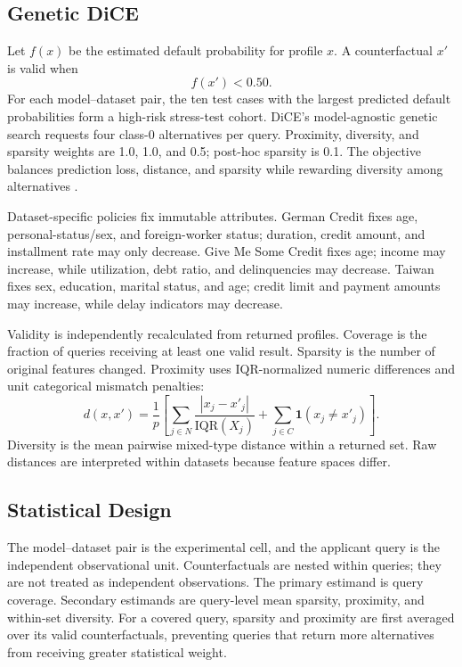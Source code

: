 \documentclass[conference]{IEEEtran}
\begin{document}
\subsection{Genetic DiCE}
Let $f(x)$ be the estimated default probability for profile $x$. A counterfactual $x'$ is valid when
\begin{equation} f(x') < 0.50. \end{equation}
For each model--dataset pair, the ten test cases with the largest predicted default probabilities form a high-risk stress-test cohort. DiCE's model-agnostic genetic search requests four class-0 alternatives per query. Proximity, diversity, and sparsity weights are 1.0, 1.0, and 0.5; post-hoc sparsity is 0.1. The objective balances prediction loss, distance, and sparsity while rewarding diversity among alternatives \cite{mothilal2020dice}.

Dataset-specific policies fix immutable attributes. German Credit fixes age, personal-status/sex, and foreign-worker status; duration, credit amount, and installment rate may only decrease. Give Me Some Credit fixes age; income may increase, while utilization, debt ratio, and delinquencies may decrease. Taiwan fixes sex, education, marital status, and age; credit limit and payment amounts may increase, while delay indicators may decrease.

Validity is independently recalculated from returned profiles. Coverage is the fraction of queries receiving at least one valid result. Sparsity is the number of original features changed. Proximity uses IQR-normalized numeric differences and unit categorical mismatch penalties:
\begin{equation}
d(x,x')=\frac{1}{p}\left[\sum_{j\in N}\frac{|x_j-x'_j|}{\mathrm{IQR}(X_j)}+\sum_{j\in C}\mathbf{1}(x_j\neq x'_j)\right].
\end{equation}
Diversity is the mean pairwise mixed-type distance within a returned set. Raw distances are interpreted within datasets because feature spaces differ.

\subsection{Statistical Design}
The model--dataset pair is the experimental cell, and the applicant query is the independent observational unit. Counterfactuals are nested within queries; they are not treated as independent observations. The primary estimand is query coverage. Secondary estimands are query-level mean sparsity, proximity, and within-set diversity. For a covered query, sparsity and proximity are first averaged over its valid counterfactuals, preventing queries that return more alternatives from receiving greater statistical weight.
\end{document}
